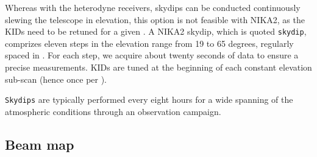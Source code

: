 Whereas with the heterodyne receivers, skydips can be
conducted continuously slewing the telescope in elevation, this
option is not feasible with NIKA2, as the KIDs need to be retuned
for a given \airmass. A NIKA2 skydip, which is quoted {\tt skydip},
comprizes eleven steps in the elevation range from 19 to 65 degrees,
regularly spaced in \airmass. For each step, we acquire about twenty
seconds of data to ensure a precise measurements. KIDs are tuned at
the beginning of each constant elevation sub-scan (hence once per
\airmass).

{\tt Skydips} {\lp are typically performed every eight hours for a wide spanning
of the atmospheric conditions through an observation campaign.} 


%



\subsection{Beam map}
\label{se:beammaps}

